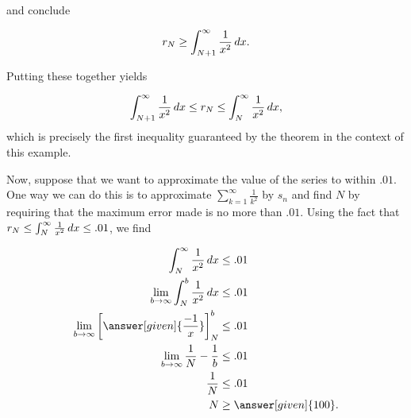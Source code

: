 \documentclass{ximera}
\begin{document}
\begin{model}
\begin{image}
\end{image}

and conclude

\[
r_{N} \geq \int_{N+1}^\infty \frac{1}{x^2} \mathop{}\!d x .
\]

Putting these together yields

\[
 \int_{N+1}^\infty \frac{1}{x^2} \mathop{}\!d x  \leq r_{N} \leq \int_N^\infty \frac{1}{x^2} \mathop{}\!d x , 
\]
which is precisely the first inequality guaranteed by the theorem in the context of this example.

Now, suppose that we want to approximate the value of the series to within $.01$.  One way we can do this is to approximate $\sum_{k=1}^{\infty} \frac{1}{k^2} $ by $s_n$ and find $N$ by requiring that the maximum error made is no more than $.01$.  Using the fact that $r_N \leq \int_N^\infty \frac{1}{x^2} \mathop{}\!d x \leq .01$, we find 

    \begin{align*}
      \int_N^\infty \frac{1}{x^2} \d x & \leq .01\\
      \lim_{b \to \infty} \int_N^b \frac{1}{x^2} \d x &\leq .01\\
      \lim_{b \to \infty} \eval{\answer[given]{\frac{-1}{x}}}_N^b& \leq .01\\
      \lim_{b \to \infty} \frac{1}{N} - \frac{1}{b}& \leq .01\\
      \frac{1}{N} &\leq .01\\
      N&\geq\answer[given]{100}.
    \end{align*}


\end{model}
\end{document}
